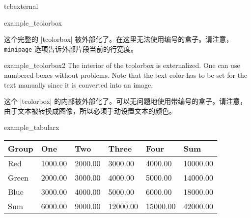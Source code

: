 \begin{docEnvironment}[doc new=2015-03-11]{tcbexternal}{}
\begin{dispExample}
\begin{tcbexternal}[minipage]{example_tcolorbox}
\begin{tcolorbox}[nobeforeafter,enhanced,
      fonttitle=\bfseries,title=Externalized Box,
      colframe=red!50!black,drop fuzzy shadow,
      interior style={fill overzoom image=goldshade.png}]
这个完整的 |tcolorbox| 被外部化了。在这里无法使用编号的盒子。请注意，\texttt{minipage} 选项告诉外部片段当前的行宽度。
\end{tcolorbox}
\end{tcbexternal}
\end{dispExample}

\begin{dispExample}
\begin{tcolorbox}[nobeforeafter,enhanced,
      fonttitle=\bfseries,title=Externalized Box,
      colframe=blue!50!black,
      interior style={fill overzoom image=blueshade.png}]
\begin{tcbexternal}[minipage]{example_tcolorbox2}
\color{white}%
The interior of the tcolorbox is externalized.
One can use numbered boxes without problems.
Note that the text color has to be set for the text manually
since it is converted into an image.

这个 |tcolorbox| 的内部被外部化了。可以无问题地使用带编号的盒子。请注意，由于文本被转换成图像，所以必须手动设置文本的颜色。
\end{tcbexternal}
\end{tcolorbox}
\end{dispExample}



\begin{dispExample}
\begin{tcbexternal}[minipage]{example_tabularx}
  \begin{tabularx}{\linewidth}{|l||Y|Y|Y|Y||Y|}\hline
    Group & One & Two & Three & Four & Sum\\\hline\hline
    Red & 1000.00 & 2000.00 & 3000.00 & 4000.00 & 10000.00\\\hline
    Green & 2000.00 & 3000.00 & 4000.00 & 5000.00 & 14000.00\\\hline
    Blue & 3000.00 & 4000.00 & 5000.00 & 6000.00 & 18000.00\\\hline\hline
    Sum & 6000.00 & 9000.00 & 12000.00 & 15000.00 & 42000.00\\\hline
  \end{tabularx}
\end{tcbexternal}
\end{dispExample}
\end{docEnvironment}

